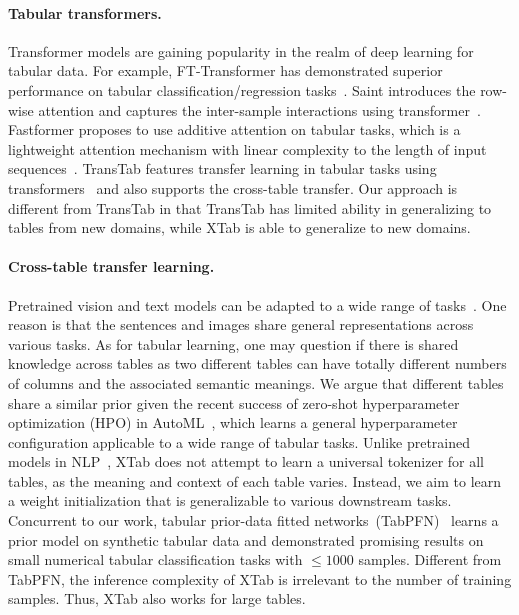 \paragraph{Tabular transformers.} Transformer models are gaining popularity in the realm of deep learning for tabular data. For example, FT-Transformer has demonstrated superior performance on tabular classification/regression tasks~\citep{gorishniy2021revisiting}. Saint introduces the row-wise attention and captures the inter-sample interactions using transformer~\citep{somepalli2021saint}. Fastformer proposes to use additive attention on tabular tasks, which is a lightweight attention mechanism with linear complexity to the length of input sequences~\citep{wu2021fastformer}. TransTab features transfer learning in tabular tasks using transformers~\citep{wang2022transtab} and also supports the cross-table transfer. Our approach is different from TransTab in that TransTab has limited ability in generalizing to tables from new domains, while XTab is able to generalize to new domains.

\paragraph{Cross-table transfer learning.} Pretrained vision and text models can be adapted to a wide range of tasks~\cite{bommasani2021opportunities}. One reason is that the sentences and images share general representations across various tasks. As for tabular learning, one may question if there is shared knowledge across tables as two different tables can have totally different numbers of columns and the associated semantic meanings. We argue that different tables share a similar prior given the recent success of zero-shot hyperparameter optimization (HPO) in AutoML~\citep{winkelmolen2020practical}, which learns a general hyperparameter configuration applicable to a wide range of tabular tasks. Unlike pretrained models in NLP~\citep{devlin2018bert}, XTab does not attempt to learn a universal tokenizer for all tables, as the meaning and context of each table varies. Instead, we aim to learn a weight initialization that is generalizable to various downstream tasks. Concurrent to our work, tabular prior-data fitted networks~(TabPFN)~\citep{hollmann2022tabpfn} learns a prior model on synthetic tabular data and demonstrated promising results on small numerical tabular classification tasks with $\leq1000$ samples. Different from TabPFN, the inference complexity of XTab is irrelevant to the number of training samples. Thus, XTab also works for large tables.

